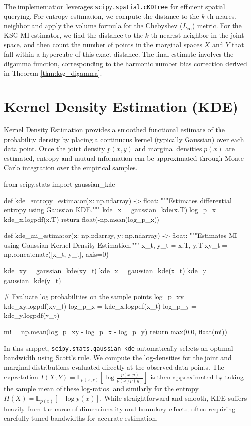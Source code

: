 The implementation leverages \texttt{scipy.spatial.cKDTree} for efficient spatial querying. For entropy estimation, we compute the distance to the $k$-th nearest neighbor and apply the volume formula for the Chebyshev ($L_\infty$) metric. For the KSG MI estimator, we find the distance to the $k$-th nearest neighbor in the joint space, and then count the number of points in the marginal spaces $X$ and $Y$ that fall within a hypercube of this exact distance. The final estimate involves the digamma function, corresponding to the harmonic number bias correction derived in Theorem \ref{thm:ksg_digamma}.

\section{Kernel Density Estimation (KDE)}

Kernel Density Estimation provides a smoothed functional estimate of the probability density by placing a continuous kernel (typically Gaussian) over each data point. Once the joint density $p(x, y)$ and marginal densities $p(x)$ are estimated, entropy and mutual information can be approximated through Monte Carlo integration over the empirical samples.

\begin{pycode}
from scipy.stats import gaussian_kde

def kde_entropy_estimator(x: np.ndarray) -> float:
    """Estimates differential entropy using Gaussian KDE."""
    kde_x = gaussian_kde(x.T)
    log_p_x = kde_x.logpdf(x.T)
    return float(-np.mean(log_p_x))

def kde_mi_estimator(x: np.ndarray, y: np.ndarray) -> float:
    """Estimates MI using Gaussian Kernel Density Estimation."""
    x_t, y_t = x.T, y.T
    xy_t = np.concatenate([x_t, y_t], axis=0)
    
    kde_xy = gaussian_kde(xy_t)
    kde_x = gaussian_kde(x_t)
    kde_y = gaussian_kde(y_t)
    
    # Evaluate log probabilities on the sample points
    log_p_xy = kde_xy.logpdf(xy_t)
    log_p_x = kde_x.logpdf(x_t)
    log_p_y = kde_y.logpdf(y_t)
    
    mi = np.mean(log_p_xy - log_p_x - log_p_y)
    return max(0.0, float(mi))
\end{pycode}

In this snippet, \texttt{scipy.stats.gaussian\_kde} automatically selects an optimal bandwidth using Scott's rule. We compute the log-densities for the joint and marginal distributions evaluated directly at the observed data points. The expectation $I(X; Y) = \mathbb{E}_{p(x, y)} [\log \frac{p(x, y)}{p(x)p(y)}]$ is then approximated by taking the sample mean of these log-ratios, and similarly for the entropy $H(X) = \mathbb{E}_{p(x)} [-\log p(x)]$. While straightforward and smooth, KDE suffers heavily from the curse of dimensionality and boundary effects, often requiring carefully tuned bandwidths for accurate estimation.

